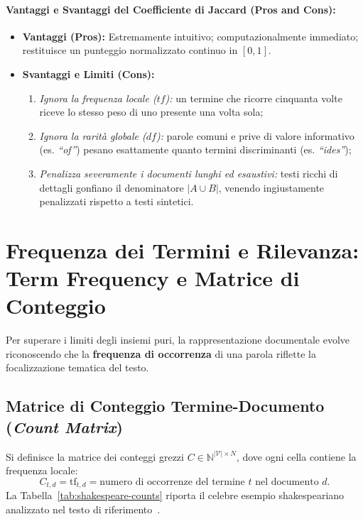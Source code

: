 \paragraph{Vantaggi e Svantaggi del Coefficiente di Jaccard (Pros and Cons):}
\begin{itemize}
    \item \textbf{Vantaggi (Pros):} Estremamente intuitivo; computazionalmente immediato; restituisce un punteggio normalizzato continuo in $[0, 1]$.
    \item \textbf{Svantaggi e Limiti (Cons):}
    \begin{enumerate}
        \item \textit{Ignora la frequenza locale ($tf$):} un termine che ricorre cinquanta volte riceve lo stesso peso di uno presente una volta sola;
        \item \textit{Ignora la rarit\`a globale ($df$):} parole comuni e prive di valore informativo (es. \textit{``of''}) pesano esattamente quanto termini discriminanti (es. \textit{``ides''});
        \item \textit{Penalizza severamente i documenti lunghi ed esaustivi:} testi ricchi di dettagli gonfiano il denominatore $|A \cup B|$, venendo ingiustamente penalizzati rispetto a testi sintetici.
    \end{enumerate}
\end{itemize}

\FloatBarrier
\section{Frequenza dei Termini e Rilevanza: Term Frequency e Matrice di Conteggio}
\label{sec:term-frequency-conteggi}

Per superare i limiti degli insiemi puri, la rappresentazione documentale evolve riconoscendo che la \textbf{frequenza di occorrenza} di una parola riflette la focalizzazione tematica del testo.

\FloatBarrier
\subsection{Matrice di Conteggio Termine-Documento (\textit{Count Matrix})}
\label{subsec:matrice-conteggio}

Si definisce la matrice dei conteggi grezzi $C \in \mathbb{N}^{|\mathcal{V}| \times N}$, dove ogni cella contiene la frequenza locale:
\begin{equation}
C_{t, d} = \text{tf}_{t, d} = \text{numero di occorrenze del termine } t \text{ nel documento } d.
\end{equation}
La Tabella~\ref{tab:shakespeare-counts} riporta il celebre esempio shakespeariano analizzato nel testo di riferimento~\cite{manning2008}.

